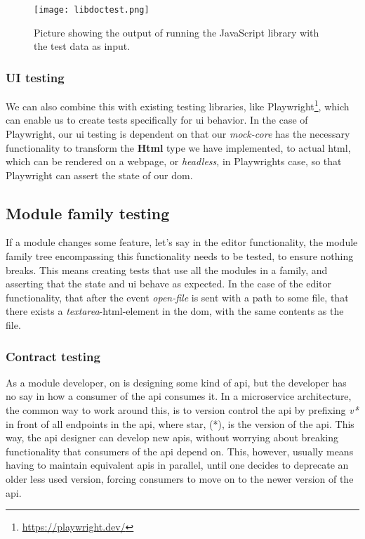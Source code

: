\begin{figure}
  \centering
  \texttt{[image: libdoctest.png]}
  \caption{
    Picture showing the output of running the JavaScript library with the test
    data as input.
  }
  \label{pic:libTest}
\end{figure}




\subsubsection{UI testing}

We can also combine this with existing testing libraries, like Playwright\footnote{\url{https://playwright.dev/}},
which can enable us to create tests specifically for \gls*{ui} behavior. In the
case of Playwright, our \gls*{ui} testing is dependent on that our
\textit{mock-core} has the necessary functionality to transform the
\textbf{Html} type we have implemented, to actual \gls*{html}, which can be
rendered on a webpage, or \textit{headless}, in Playwrights case, so that
Playwright can assert the state of our \gls*{dom}.


\subsection{Module family testing}

If a module changes some feature, let's say in the editor functionality, the
module family tree encompassing this functionality needs to be tested, to ensure
nothing breaks. This means creating tests that use all the modules in a family,
and asserting that the state and \gls*{ui} behave as expected. In the case of
the editor functionality, that after the event \textit{open-file} is sent with
a path to some file, that there exists a \textit{textarea}-\gls*{html}-element in
the \gls*{dom}, with the same contents as the file.

\subsubsection{Contract testing}

As a module developer, on is designing some kind of \gls*{api}, but the developer
has no say in how a consumer of the \gls*{api} consumes it. In a microservice
architecture, the common way to work around this, is to version control the
\gls*{api} by prefixing \textit{v*} in front of all endpoints in the \gls*{api},
where star, (*), is the version of the \gls*{api}. This way, the \gls*{api}
designer can develop new \gls*{api}s, without worrying about breaking
functionality that consumers of the \gls*{api} depend on. This, however, usually
means having to maintain equivalent \gls*{api}s in parallel, until one decides
to deprecate an older less used version, forcing consumers to move on to the
newer version of the \gls*{api}.

